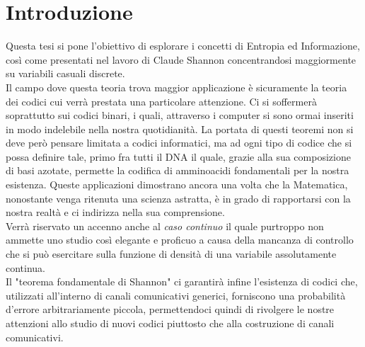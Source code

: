 \chapter*{Introduzione} %
\label{sommario}

Questa tesi si pone l'obiettivo di esplorare i concetti di Entropia ed Informazione, così come presentati nel lavoro di Claude Shannon \cite{Shannon} concentrandosi maggiormente su variabili casuali discrete.\\
Il campo dove questa teoria trova maggior applicazione è sicuramente la teoria dei codici cui verrà prestata una particolare attenzione. Ci si soffermerà soprattutto sui codici binari, i quali, attraverso i computer si sono ormai inseriti in modo indelebile nella nostra quotidianità. La portata di questi teoremi non si deve però pensare limitata a codici informatici, ma ad ogni tipo di codice che si possa definire tale, primo fra tutti il DNA il quale, grazie alla sua composizione di basi azotate, permette la codifica di amminoacidi fondamentali per la nostra esistenza. Queste applicazioni dimostrano ancora una volta che la Matematica, nonostante venga ritenuta una scienza astratta, è in grado di rapportarsi con la nostra realtà e ci indirizza nella sua comprensione.\\
Verrà riservato un accenno anche al \textit{caso continuo} il quale purtroppo non ammette uno studio così elegante e proficuo a causa della mancanza di controllo che si può esercitare sulla funzione di densità di una variabile assolutamente continua.\\
Il "teorema fondamentale di Shannon" ci garantirà infine l'esistenza di codici che, utilizzati all'interno di canali comunicativi generici, forniscono una probabilità d'errore arbitrariamente piccola, permettendoci quindi di rivolgere le nostre attenzioni allo studio di nuovi codici piuttosto che alla costruzione di canali comunicativi.


\clearpage


